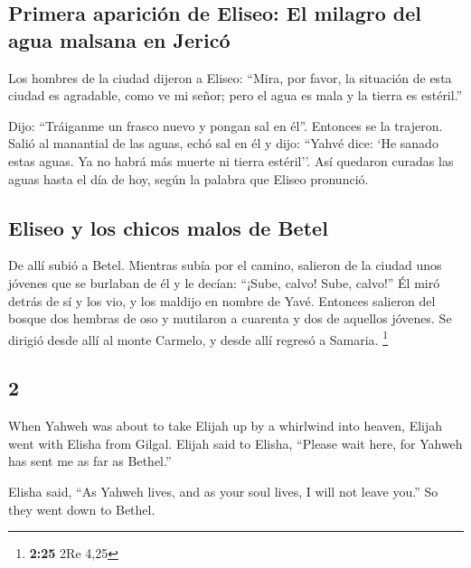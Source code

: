 \begin{paracol}{2}
\hypertarget{primera-apariciuxf3n-de-eliseo-el-milagro-del-agua-malsana-en-jericuxf3}{%
\subsection{Primera aparición de Eliseo: El milagro del agua malsana en
Jericó}\label{primera-apariciuxf3n-de-eliseo-el-milagro-del-agua-malsana-en-jericuxf3}}

 Los hombres de la ciudad dijeron a Eliseo: ``Mira, por
favor, la situación de esta ciudad es agradable, como ve mi señor; pero
el agua es mala y la tierra es estéril.''

 Dijo: ``Tráiganme un frasco nuevo y pongan sal en él''.
Entonces se la trajeron.  Salió al manantial de las
aguas, echó sal en él y dijo: ``Yahvé dice: `He sanado estas aguas. Ya
no habrá más muerte ni tierra estéril''.  Así quedaron
curadas las aguas hasta el día de hoy, según la palabra que Eliseo
pronunció.

\hypertarget{eliseo-y-los-chicos-malos-de-betel}{%
\subsection{Eliseo y los chicos malos de
Betel}\label{eliseo-y-los-chicos-malos-de-betel}}

 De allí subió a Betel. Mientras subía por el camino,
salieron de la ciudad unos jóvenes que se burlaban de él y le decían:
``¡Sube, calvo! Sube, calvo!''  Él miró detrás de sí y
los vio, y los maldijo en nombre de Yavé. Entonces salieron del bosque
dos hembras de oso y mutilaron a cuarenta y dos de aquellos jóvenes.
 Se dirigió desde allí al monte Carmelo, y desde allí
regresó a Samaria. \footnote{\textbf{2:25} 2Re 4,25}

\switchcolumn
\begin{otherlanguage}{english}

\hypertarget{section-3}{%
\section{2}\label{section-3}}

 When Yahweh was about to take Elijah up by a whirlwind
into heaven, Elijah went with Elisha from Gilgal.  Elijah
said to Elisha, ``Please wait here, for Yahweh has sent me as far as
Bethel.''

Elisha said, ``As Yahweh lives, and as your soul lives, I will not leave
you.'' So they went down to Bethel.


\end{otherlanguage}
\end{paracol}
